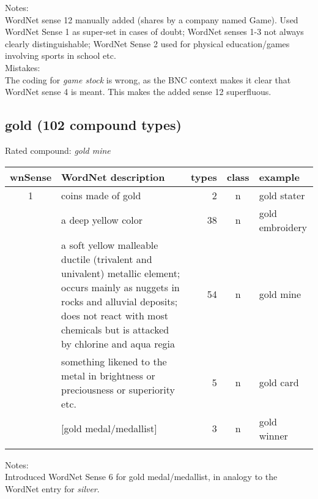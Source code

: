 \noindent
Notes:\\ 
WordNet sense 12 manually added (shares by a company named Game). 
Used WordNet Sense 1 as super-set in cases of doubt; WordNet senses 1-3 not
  always clearly distinguishable; WordNet Sense 2 used for physical
  education/games involving sports in school etc.\\
Mistakes:\\
The coding for \emph{game stock} is wrong, as the BNC context makes it clear that WordNet sense 4 is meant. This makes the added sense 12 superfluous.

\newpage
\subsection{gold         (102 compound types)}
Rated compound: \emph{gold mine}

\vspace*{1ex}

\noindent
\begin{longtable}{c>{\raggedright\arraybackslash}p{5cm}rc>{\raggedright\arraybackslash}p{2cm}}\lsptoprule
{\small wnSense}&WordNet description&types&class&example\\\midrule
1&coins made of gold&2&n&gold stater\\\tablevspace
2&a deep yellow color&38&n&gold embroidery\\\tablevspace
 3& a soft yellow malleable ductile (trivalent and univalent) metallic
element; occurs mainly as nuggets in rocks and alluvial deposits; does
not react with most chemicals but is attacked by chlorine and aqua
regia& 54& n& gold mine\\\tablevspace
5&something likened to the metal in brightness or preciousness or
superiority etc.&5&n&gold card\\\tablevspace
6&{}[gold medal/medallist]&3&n&gold winner\\\lspbottomrule
\end{longtable}

\noindent
Notes:\\ Introduced WordNet Sense 6 for gold medal/medallist, in analogy to the
WordNet entry for \emph{silver}.


